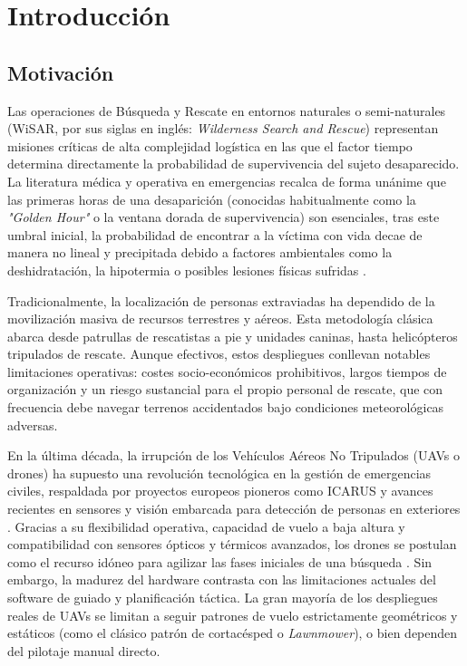 \chapter{Introducción}

\section{Motivación}
Las operaciones de Búsqueda y Rescate en entornos naturales o semi-naturales (WiSAR, por sus siglas en inglés: \textit{Wilderness Search and Rescue}) representan misiones críticas de alta complejidad logística en las que el factor tiempo determina directamente la probabilidad de supervivencia del sujeto desaparecido. La literatura médica y operativa en emergencias recalca de forma unánime que las primeras horas de una desaparición (conocidas habitualmente como la \textit{"Golden Hour"} o la ventana dorada de supervivencia) son esenciales, tras este umbral inicial, la probabilidad de encontrar a la víctima con vida decae de manera no lineal y precipitada debido a factores ambientales como la deshidratación, la hipotermia o posibles lesiones físicas sufridas \cite{lyu2023, ewers2025deep, mishra2020drone}.

Tradicionalmente, la localización de personas extraviadas ha dependido de la movilización masiva de recursos terrestres y aéreos. Esta metodología clásica abarca desde patrullas de rescatistas a pie y unidades caninas, hasta helicópteros tripulados de rescate. Aunque efectivos, estos despliegues conllevan notables limitaciones operativas: costes socio-económicos prohibitivos, largos tiempos de organización y un riesgo sustancial para el propio personal de rescate, que con frecuencia debe navegar terrenos accidentados bajo condiciones meteorológicas adversas.

En la última década, la irrupción de los Vehículos Aéreos No Tripulados (UAVs o drones) ha supuesto una revolución tecnológica en la gestión de emergencias civiles, respaldada por proyectos europeos pioneros como ICARUS \cite{icarus2016project} y avances recientes en sensores y visión embarcada para detección de personas en exteriores \cite{alonso2025utilizacion}. Gracias a su flexibilidad operativa, capacidad de vuelo a baja altura y compatibilidad con sensores ópticos y térmicos avanzados, los drones se postulan como el recurso idóneo para agilizar las fases iniciales de una búsqueda \cite{rahman2025}. Sin embargo, la madurez del hardware contrasta con las limitaciones actuales del software de guiado y planificación táctica. La gran mayoría de los despliegues reales de UAVs se limitan a seguir patrones de vuelo estrictamente geométricos y estáticos (como el clásico patrón de cortacésped o \textit{Lawnmower}), o bien dependen del pilotaje manual directo.

